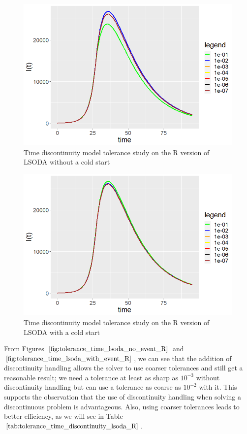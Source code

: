 \begin{figure}[H]
\centering
\includegraphics[width=0.7\linewidth]{./figures/tolerance_time_lsoda_no_event_R}
\caption{Time discontinuity model tolerance study on the R version of LSODA without a cold start}
\label{fig:tolerance_time_lsoda_no_event_R}
\end{figure}

\begin{figure}[H]
\centering
\includegraphics[width=0.7\linewidth]{./figures/tolerance_time_lsoda_with_event_R}
\caption{Time discontinuity model tolerance study on the R version of LSODA with a cold start}
\label{fig:tolerance_time_lsoda_with_event_R}
\end{figure}

From Figures $\ref{fig:tolerance_time_lsoda_no_event_R}$ and $\ref{fig:tolerance_time_lsoda_with_event_R}$, we can see that the addition of discontinuity handling allows the solver to use coarser tolerances and still get a reasonable result; we need a tolerance at least as sharp as $10^{-3}$ without discontinuity handling but can use a tolerance as coarse as $10^{-2}$ with it. This supports the observation that the use of discontinuity handling when solving a discontinuous problem is advantageous. Also, using coarser tolerances leads to better efficiency, as we will see in Table $\ref{tab:tolerance_time_discontinuity_lsoda_R}$. 

